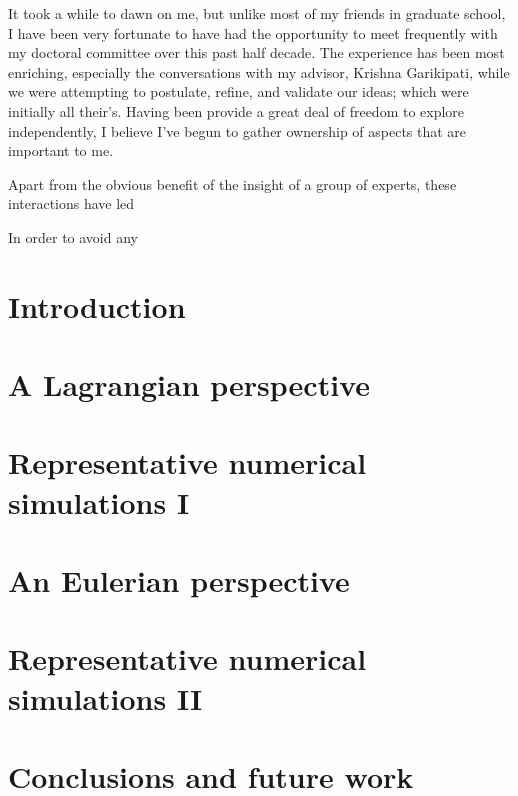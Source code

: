 \documentclass[leqno,final]{report}
\begin{document}

\startacknowledgementspage

{
  It took a while to dawn on me,  but unlike most of my friends in
  graduate school, I have been very fortunate to have had the
  opportunity to meet frequently with my doctoral committee over this
  past half decade. The experience has been most enriching, especially
  the conversations with my advisor, Krishna Garikipati, while we were
  attempting to postulate, refine, and validate our ideas; which were
  initially all their's. Having been provide a great deal of freedom
  to explore independently, I believe I've begun to gather ownership
  of aspects that are important to me.

  Apart from the obvious benefit of the insight of a group of experts,
  these interactions have led 

  In order to avoid any 
}

\tableofcontents
\listoffigures
\listoftables
\listofappendices

\startthechapters 

\chapter{Introduction}
\label{introduction}

\chapter{A Lagrangian perspective}
\label{lagrangian-perspective} 

\chapter{Representative numerical simulations I}
\label{numerical-simulations-1}

\chapter{An Eulerian perspective}
\label{eulerian-perspective}

\chapter{Representative numerical simulations II}
\label{numerical-simulations-2}

\chapter{Conclusions and future work}
\label{conclusions}

\end{document}

